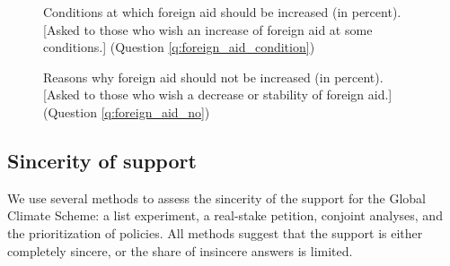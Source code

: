 \begin{figure}[h!]
  \caption[Conditions at which foreign aid should be increased]{Conditions at which foreign aid should be increased (in percent). [Asked to those who wish an increase of foreign aid at some conditions.] (Question \ref{q:foreign_aid_condition})}\label{fig:foreign_aid_condition}
\end{figure}

\begin{figure}[h!]
  \caption[Reasons why foreign aid should not be increased]{Reasons why foreign aid should not be increased (in percent). [Asked to those who wish a decrease or stability of foreign aid.] (Question \ref{q:foreign_aid_no})}\label{fig:foreign_aid_no}
\end{figure}

\subsection{Sincerity of support}

We use several methods to assess the sincerity of the support for the Global Climate Scheme: a list experiment, a real-stake petition, conjoint analyses, and the prioritization of policies. All methods suggest that the support is either completely sincere, or the share of insincere answers is limited. 

